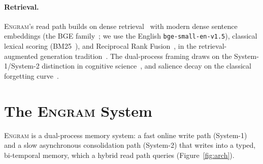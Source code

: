 \documentclass{article}
\newcommand{\engram}{\textsc{Engram}}
\begin{document}
\paragraph{Retrieval.}
\engram{}'s read path builds on dense retrieval~\citep{karpukhin2020dpr} with modern dense sentence
embeddings (the BGE family~\citep{xiao2024cpack}; we use the English \texttt{bge-small-en-v1.5}), classical
lexical scoring (BM25~\citep{robertson2009bm25}), and Reciprocal Rank Fusion~\citep{cormack2009rrf}, in
the retrieval-augmented generation tradition~\citep{lewis2020rag}. The dual-process framing draws on the System-1/System-2 distinction in
cognitive science~\citep{kahneman2011thinking}, and salience decay on the classical forgetting
curve~\citep{ebbinghaus1913memory}.

\section{The \engram{} System}
\label{sec:system}

\engram{} is a dual-process memory system: a fast online write path (System-1) and a slow asynchronous
consolidation path (System-2) that writes into a typed, bi-temporal memory, which a hybrid read path queries
(Figure~\ref{fig:arch}).
\end{document}
